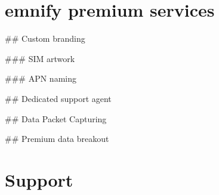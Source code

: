 \documentclass[11pt, oneside]{article}   	%
\begin{document}
\section{emnify premium services}

\begin{markdown}

## Custom branding

### SIM artwork

### APN naming

## Dedicated support agent

## Data Packet Capturing

## Premium data breakout

\end{markdown}

\pagebreak[4]

\section{Support}
\end{document}
